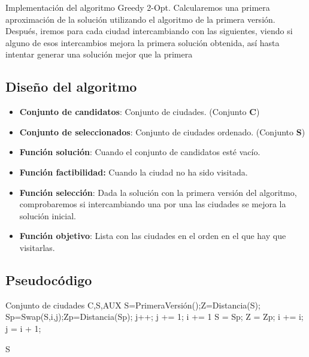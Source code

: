 		Implementación del algoritmo Greedy 2-Opt. Calcularemos una primera aproximación de la solución utilizando el algoritmo de la primera versión. Después, iremos para cada ciudad intercambiando con las siguientes, viendo si alguno de esos intercambios mejora la primera solución obtenida, así hasta intentar generar una solución mejor que la primera
		
	\subsection{Diseño del algoritmo} 
	
		\begin{itemize}
			\item \textbf{Conjunto de candidatos}: Conjunto de ciudades. (Conjunto \textbf{C})
			\item \textbf{Conjunto de seleccionados}: Conjunto de ciudades ordenado. (Conjunto \textbf{S})
			\item \textbf{Función solución}: Cuando el conjunto de candidatos esté vacío.
			\item \textbf{Función factibilidad:} Cuando la ciudad no ha sido visitada.
			\item \textbf{Función selección}: Dada la solución con la primera versión del algoritmo, comprobaremos si intercambiando una por una las ciudades se mejora la solución inicial.
			\item \textbf{Función objetivo}: Lista con las ciudades en el orden en el que hay que visitarlas.		
		\end{itemize}
		
		
	\subsection{Pseudocódigo}

		\begin{algorithmic}				
			\Require Conjunto de ciudades C,S,AUX
			\State S=PrimeraVersión();Z=Distancia(S);
			\State Sp=Swap(S,i,j);Zp=Distancia(Sp);
			\State j++;
			\EndIf
			\State j += 1; i += 1
			\EndIf
			\State S = Sp; Z = Zp;
			\State i += i; j = i + 1;
			\EndIf
			\EndWhile  
			
			\Return S	
			
			
			
		\end{algorithmic}
		

